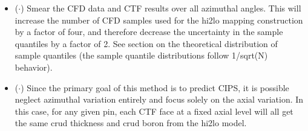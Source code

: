 \begin{itemize}
        \item ($\cdot$) Smear the CFD data and CTF results over all azimuthal angles.  This will increase the number of CFD samples used for the hi2lo mapping construction by a factor of four, and therefore decrease the uncertainty in the sample quantiles by a factor of 2.  See section on the theoretical distribution of sample quantiles (the sample quantile distributions follow 1/sqrt(N) behavior).
        \item ($\cdot$) Since the primary goal of this method is to predict CIPS, it is possible neglect azimuthal variation entirely and focus solely on the axial variation.  In this case, for any given pin, each CTF face at a fixed axial level will all get the same crud thickness and crud boron from the hi2lo model.
\end{itemize}
